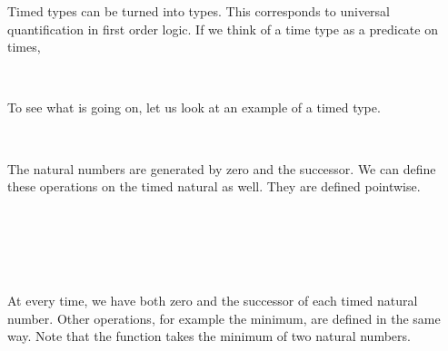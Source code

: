 Timed types can be turned into types.
This corresponds to universal quantification in first order logic.
If we think of a time type as a predicate on times, 

\begin{code}%
\>[0]\AgdaSpace{}%
\AgdaSymbol{:}\AgdaSpace{}%
\AgdaSpace{}%
\AgdaSpace{}%
\<%
\\
\>[0]\AgdaSpace{}%
\AgdaSpace{}%
\AgdaSymbol{=}\AgdaSpace{}%
\AgdaSymbol{\{}\AgdaSpace{}%
\AgdaSymbol{:}\AgdaSpace{}%
\AgdaSymbol{\}}\AgdaSpace{}%
\AgdaSpace{}%
\AgdaSpace{}%
\<%
\end{code}

To see what is going on, let us look at an example of a timed type.

\begin{code}%
\>[0]\AgdaSpace{}%
\AgdaSymbol{:}\AgdaSpace{}%
\<%
\\
\>[0]\AgdaSpace{}%
\AgdaSymbol{=}\AgdaSpace{}%
\AgdaSpace{}%
\<%
\end{code}

The natural numbers are generated by zero and the successor.
We can define these operations on the timed natural as well.
They are defined pointwise.

\begin{code}%
\>[0]\AgdaSpace{}%
\AgdaSymbol{:}\AgdaSpace{}%
\AgdaSpace{}%
\<%
\\
\>[0]\AgdaSpace{}%
\AgdaSymbol{\{}\AgdaSymbol{\}}\AgdaSpace{}%
\AgdaSymbol{=}\AgdaSpace{}%
\<%
\\
%
\\[\AgdaEmptyExtraSkip]%
\>[0]\AgdaSpace{}%
\AgdaSymbol{:}\AgdaSpace{}%
\AgdaSymbol{(}\AgdaSpace{}%
\AgdaSpace{}%
\AgdaSymbol{)}\<%
\\
\>[0]\AgdaSpace{}%
\AgdaSymbol{\{}\AgdaSymbol{\}}\AgdaSpace{}%
\AgdaSpace{}%
\AgdaSymbol{=}\AgdaSpace{}%
\AgdaSpace{}%
\<%
\end{code}

At every time, we have both zero and the successor of each timed natural number.
Other operations, for example the minimum, are defined in the same way.
Note that the function  takes the minimum of two natural numbers.

